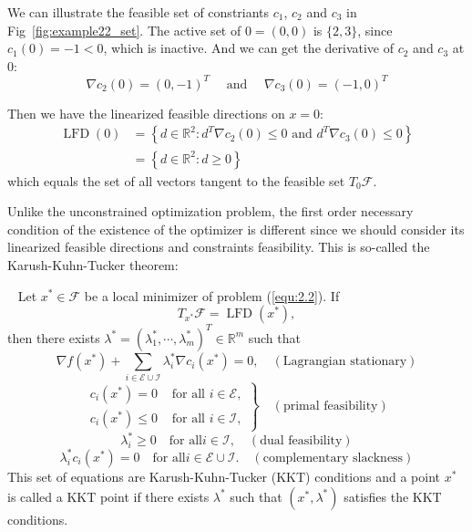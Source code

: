 \par We can illustrate the feasible set of constriants $c_1$, $c_2$ and $c_3$ in Fig~\ref{fig:example22_set}. The active set of $0=(0,0)$ is $\{2, 3\}$, since $c_1(0) = -1 < 0$, which is inactive. And we can get the derivative of $c_2$ and $c_3$ at 0: 
$$
\nabla c_{2}(0)=(0,-1)^{T} \quad \textrm { and } \quad \nabla c_{3}(0)=(-1,0)^{T}
$$
\par Then we have the linearized feasible directions on $x=0$: 
$$
\begin{aligned} \operatorname{LFD}(0) &=\left\{d \in \mathbb{R}^{2}: d^{T} \nabla c_{2}(0) \leq 0 \text { and } d^{T} \nabla c_{3}(0) \leq 0\right\} \\ &=\left\{d \in \mathbb{R}^{2}: d \geq 0\right\} \end{aligned}
$$
which equals the set of all vectors tangent to the feasible set $T_{0} \mathscr{F}$. 
\par Unlike the unconstrained optimization problem, the first order necessary condition of the existence of the optimizer is different since we should consider its linearized feasible directions and constraints feasibility. This is so-called the Karush-Kuhn-Tucker theorem: 
\begin{thm}~\citep{JS:06}
    \label{thm:kkt}
    Let $x^* \in \mathscr{F}$ be a local minimizer of problem (\ref{equ:2.2}). If
    $$
    T_{x^*} \mathscr{F} = \operatorname{LFD}(x^*),
    $$
    then there exists $\lambda^{*}=\left(\lambda_{1}^{*}, \cdots, \lambda_{m}^{*}\right)^{T} \in \mathbb{R}^{m}$ such that 
    $$
    \nabla f\left(x^{*}\right)+\sum_{i \in \mathscr{E} \cup \mathscr{I}} \lambda_{i}^{*} \nabla c_{i}\left(x^{*}\right)=0, \quad(\textrm {Lagrangian stationary})
    $$
    $$
    \left.\begin{array}{ll}c_{i}\left(x^{*}\right)=0 & \text { for all } i \in \mathscr{E}, \\ c_{i}\left(x^{*}\right) \leq 0 & \text { for all } i \in \mathscr{I},\end{array}\right\} \quad(\textrm {primal feasibility})
    $$
    $$
    \lambda_{i}^{*} \geq 0 \quad \textrm {for all} i \in \mathscr{I}, \quad (\textrm {dual feasibility})
    $$
    $$
    \lambda_i^*c_i(x^*) = 0 \quad \textrm {for all} i \in \mathscr{E} \cup \mathscr{I}. \quad (\textrm {complementary slackness})
    $$
    This set of equations are Karush-Kuhn-Tucker (KKT) conditions and a point $x^*$ is called a KKT point if there exists $\lambda^*$ such that $(x^*, \lambda ^*)$ satisfies the KKT conditions.
\end{thm}
